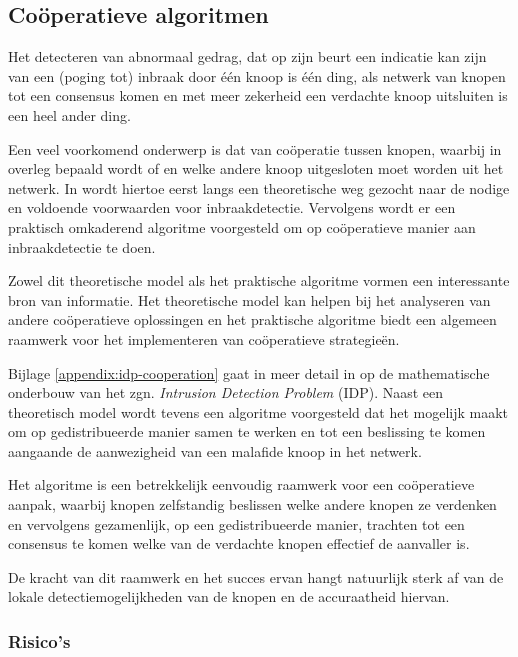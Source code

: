 \subsection{Co\"operatieve algoritmen}
\label{subsection:cooperation}

Het detecteren van abnormaal gedrag, dat op zijn beurt een indicatie kan zijn
van een (poging tot) inbraak door \'e\'en knoop is \'e\'en ding, als netwerk
van knopen tot een consensus komen en met meer zekerheid een verdachte knoop
uitsluiten is een heel ander ding.

Een veel voorkomend onderwerp is dat van co\"operatie tussen knopen, waarbij in
overleg bepaald wordt of en welke andere knoop uitgesloten moet worden uit het
netwerk. In \citep{krontiris2009cooperative} wordt hiertoe eerst langs een
theoretische weg gezocht naar de nodige en voldoende voorwaarden voor
inbraakdetectie. Vervolgens wordt er een praktisch omkaderend algoritme
voorgesteld om op co\"operatieve manier aan inbraakdetectie te doen.

Zowel dit theoretische model als het praktische algoritme vormen een
interessante bron van informatie. Het theoretische model kan helpen bij het
analyseren van andere co\"operatieve oplossingen en het praktische algoritme
biedt een algemeen raamwerk voor het implementeren van co\"operatieve
strategie\"en.

Bijlage \ref{appendix:idp-cooperation} gaat in meer detail in op de
mathematische onderbouw van het zgn. \emph{Intrusion Detection Problem} (IDP).
Naast een theoretisch model wordt tevens een algoritme voorgesteld dat het
mogelijk maakt om op gedistribueerde manier samen te werken en tot een
beslissing te komen aangaande de aanwezigheid van een malafide knoop in het
netwerk.

Het algoritme is een betrekkelijk eenvoudig raamwerk voor een co\"operatieve
aanpak, waarbij knopen zelfstandig beslissen welke andere knopen ze verdenken
en vervolgens gezamenlijk, op een gedistribueerde manier, trachten tot een
consensus te komen welke van de verdachte knopen effectief de aanvaller is.

De kracht van dit raamwerk en het succes ervan hangt natuurlijk sterk af van de
lokale detectiemogelijkheden van de knopen en de accuraatheid hiervan.

\subsubsection*{Risico's}

